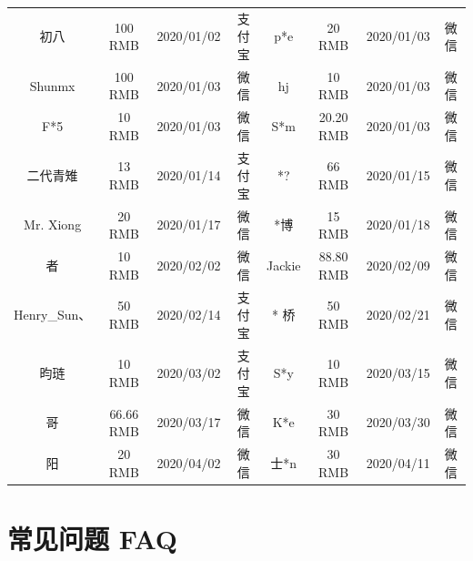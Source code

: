 \documentclass[lang=cn,11pt,a4paper,cite=authoryear]{elegantpaper}
\begin{document}
\begin{table}[!htb]
\begin{tabular}{*{4}{>{\scriptsize}c}|*{4}{>{\scriptsize}c}}
    初八    & 100 RMB  & 2020/01/02 & 支付宝   & p*e   & 20 RMB & 2020/01/03 & 微信 \\
    Shunmx & 100 RMB & 2020/01/03 & 微信    & hj    & 10 RMB & 2020/01/03 & 微信 \\
    F*5   & 10 RMB & 2020/01/03 & 微信    & S*m   & 20.20 RMB & 2020/01/03 & 微信 \\
    二代青雉  & 13 RMB & 2020/01/14 & 支付宝   & *?    & 66 RMB & 2020/01/15 & 微信 \\
    Mr. Xiong & 20 RMB & 2020/01/17 & 微信    & *博    & 15 RMB & 2020/01/18 & 微信 \\
    * 者  & 10 RMB & 2020/02/02 & 微信    & Jackie  &  88.80 RMB  &  2020/02/09 & 微信 \\
    Henry\_Sun、 & 50 RMB & 2020/02/14 & 支付宝 & * 桥  & 50 RMB & 2020/02/21 & 微信 \\
    昀琏 & 10 RMB & 2020/03/02 & 支付宝 & S*y  &  10 RMB  &  2020/03/15 & 微信 \\
    * 哥  & 66.66 RMB & 2020/03/17 & 微信    &   K*e & 30 RMB & 2020/03/30 & 微信\\
    * 阳  &  20 RMB  &  2020/04/02 & 微信 & 士*n  & 30 RMB & 2020/04/11 & 微信 \\
    \hline
    \end{tabular}%
  \label{tab:donation}%
\end{table}%

\section{常见问题 FAQ}
\end{document}
